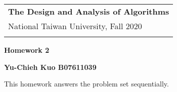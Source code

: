 \documentclass[a4paper,12pt]{article}
\begin{document}
\thispagestyle{plain} %

\begin{tabular}{p{15.5cm}} %
{\large \bf The Design and Analysis of Algorithms} \\
National Taiwan University, Fall 2020  \\
\hline %
\\
\end{tabular} %

\vspace*{0.3cm} %

\begin{center} %
	{\Large \bf Homework 2} %
	\vspace{2mm}
	
	{\bf Yu-Chieh Kuo B07611039} %
		
\end{center}  
\vspace{0.4cm}

This homework answers the problem set sequentially. 
\end{document}
